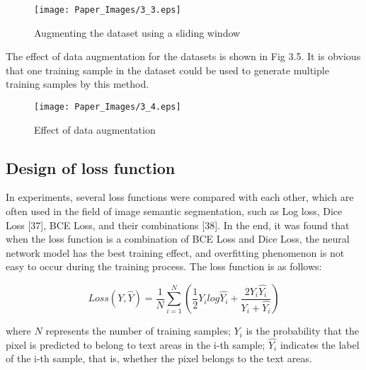 \documentclass[22pt, UTF8]{article}
\numberwithin{figure}{section}
\numberwithin{table}{section}
\numberwithin{equation}{section} %
\begin{document}
\begin{figure}[H]
    \centering
    \texttt{[image: Paper\_Images/3\_3.eps]}
    \vspace{-3mm} %
    \caption{Augmenting the dataset using a sliding window}
    \vspace{-4mm} %
\end{figure}

\setlength\parindent{2em} The effect of data augmentation for the datasets is shown in Fig 3.5. It is obvious that one training sample in the dataset could be used to generate multiple training samples by this method.

\begin{figure}[H]
    \centering
    \texttt{[image: Paper\_Images/3\_4.eps]}
    \vspace{-3mm} %
    \caption{Effect of data augmentation}
    \vspace{-4mm} %
\end{figure}

\subsection{Design of loss function}

\setlength\parindent{2em} In experiments, several loss functions were compared with each other, which are often used in the field of image semantic segmentation, such as Log loss, Dice Loss [37], BCE Loss, and their combinations [38]. In the end, it was found that when the loss function is a combination of BCE Loss and Dice Loss, the neural network model has the best training effect, and overfitting phenomenon is not easy to occur during the training process. The loss function is as follows:

\vspace{-2mm}

\begin{equation}
Loss(Y, \hat{Y}) = \frac{1}{N}\sum_{i = 1}^{N}(\frac{1}{2}Y_{i}log\hat{Y_{i}} + \frac{2Y_{i}\hat{Y_{i}}}{Y_{i} + \hat{Y_{i}}})
\end{equation}

\vspace{2mm}

\noindent where $N$ represents the number of training samples; $Y_{i}$ is the probability that the pixel is predicted to belong to text areas in the i-th sample; $\hat{Y_{i}}$ indicates the label of the i-th sample, that is, whether the pixel belongs to the text areas.
\end{document}
